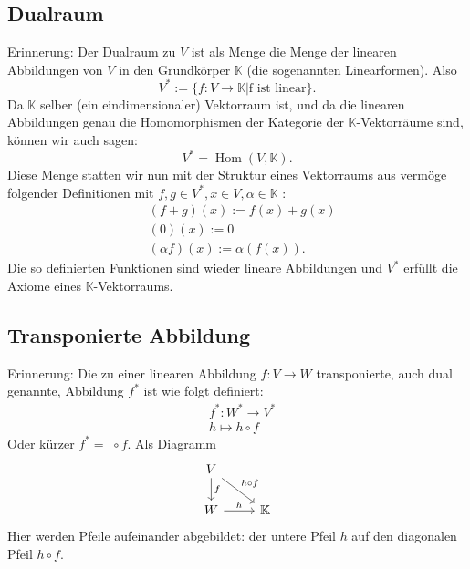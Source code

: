 \documentclass[a4paper]{amsart}
\theoremstyle{definition}
\DeclareMathOperator{\Hom}{Hom}
\newcommand{\K}{\ensuremath{\mathbb{ K }}}
\begin{document}
\subsection{Dualraum}
Erinnerung: Der Dualraum zu $V$ ist als Menge die Menge der linearen Abbildungen von $V$ in den Grundkörper $\K$ (die sogenannten Linearformen).  Also
\begin{equation}
   V^* := \{ f \colon V \to \K | \text{f ist linear} \}.
\end{equation}
Da $\K$ selber (ein eindimensionaler) Vektorraum ist, und da die linearen Abbildungen genau die Homomorphismen der Kategorie der $\K$-Vektorräume sind, können wir auch sagen:
\begin{equation}
   V^* = \Hom( V, \K ).
\end{equation}
Diese Menge statten wir nun mit der Struktur eines Vektorraums aus vermöge folgender Definitionen mit 
$f,g \in V^*, x \in V, \alpha \in \K$ :
\begin{align}
   &(f+g)(x) := f(x) + g(x)\\
   &(0)(x) := 0\\
   &(\alpha f)(x) := \alpha ( f(x) ).
\end{align}
Die so definierten Funktionen sind wieder lineare Abbildungen und $V^*$ erfüllt die Axiome eines 
$\K$-Vektorraums.

\subsection{Transponierte Abbildung}
Erinnerung: Die zu einer linearen Abbildung $f \colon V \to W$ transponierte, auch dual genannte, Abbildung $f^*$ ist wie folgt definiert:
\begin{align}
   &f^* \colon W^* \to V^* \\
   &h \mapsto h\circ f
\end{align}
Oder kürzer $f^* = \_ \circ f$. Als Diagramm
\begin{equation}
   \begin{tikzcd}
      V \arrow[rd, "h \circ f"] \arrow[d, "f"] \\
      W \arrow[r, "h"] & \K
   \end{tikzcd}
\end{equation}
Hier werden Pfeile aufeinander abgebildet: der untere Pfeil $h$ auf den diagonalen Pfeil $h \circ f$.
\end{document}
